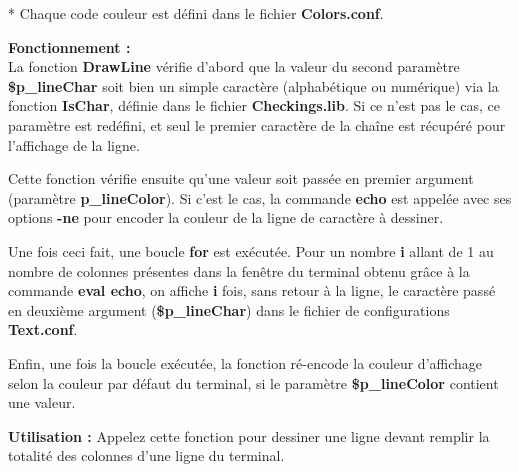 \documentclass[a4paper,10pt]{article}
\begin{document}
\begin{justify}
    * Chaque code couleur est défini dans le fichier \textbf{\color{lime}Colors.conf\color{white}}.
\end{justify}

\begin{justify}
    \textbf{Fonctionnement :}\\
    La fonction \textbf{\color{mauve}DrawLine\color{white}} vérifie d'abord que la valeur du second paramètre \textbf{\color{orange}\$p\_lineChar\color{white}} soit bien un simple caractère (alphabétique ou numérique) via la fonction \textbf{\color{mauve}IsChar\color{white}}, définie dans le fichier \textbf{\color{lime}Checkings.lib\color{white}}. Si ce n'est pas le cas, ce paramètre est redéfini, et seul le premier caractère de la chaîne est récupéré pour l'affichage de la ligne.
\end{justify}

\begin{justify}
    Cette fonction vérifie ensuite qu'une valeur soit passée en premier argument (paramètre \textbf{\color{orange}p\_lineColor\color{white}}). Si c'est le cas, la commande \textbf{\color{gray}echo\color{white}} est appelée avec ses options \textbf{\color{gray}-ne\color{white}} pour encoder la couleur de la ligne de caractère à dessiner.
\end{justify}

\begin{justify}
    Une fois ceci fait, une boucle \textbf{for} est exécutée. Pour un nombre \textbf{i} allant de 1 au nombre de colonnes présentes dans la fenêtre du terminal obtenu grâce à la commande \textbf{\color{gray}eval echo\color{white}}, on affiche \textbf{i} fois, sans retour à la ligne, le caractère passé en deuxième argument (\textbf{\color{orange}\$p\_lineChar\color{white}}) dans le fichier de
configurations \textbf{\color{lime}Text.conf\color{white}}.
\end{justify}

\begin{justify}
    Enfin, une fois la boucle exécutée, la fonction ré-encode la couleur d'affichage selon la couleur par défaut du terminal, si le paramètre \textbf{\color{orange}\$p\_lineColor\color{white}} contient une valeur.
\end{justify}

\begin{justify}
    \textbf{Utilisation :}\linebreak
    Appelez cette fonction pour dessiner une ligne devant remplir la totalité des colonnes d'une ligne du terminal.\\
\end{justify}
\end{document}
